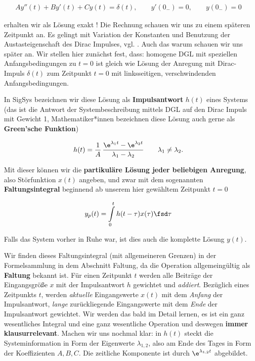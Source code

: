 \begin{mdframed}[backgroundcolor=C3!10]
\begin{align}
A y''(t) + B y'(t) + C y(t) = \delta(t),\qquad y'(0_-) = 0,\qquad y(0_-) = 0
\end{align}
\end{mdframed}
erhalten wir als Lösung exakt !
%
Die Rechnung schauen wir uns zu einem späteren Zeitpunkt an. Es gelingt mit Variation
der Konstanten und Benutzung der Austasteigenschaft des Dirac Impulses,
vgl. \cite[S.133ff]{Strang2014}.
%
Auch das warum schauen wir uns später an. Wir stellen hier zunächst fest, dass:
homogene DGL mit speziellen Anfangsbedingungen zu $t=0$ ist gleich wie
Lösung der Anregung mit Dirac-Impuls $\delta(t)$ zum Zeitpunkt $t=0$ mit
linksseitigen, verschwindenden Anfangsbedingungen.

In SigSys bezeichnen wir diese Lösung als \textbf{Impulsantwort} $h(t)$
eines Systems (das ist die Antwort der Systembeschreibung mittels DGL auf den
Dirac Impuls mit Gewicht 1, Mathematiker*innen
bezeichnen diese Lösung auch gerne als \textbf{Green'sche Funktion})
\begin{mdframed}[backgroundcolor=C3!10]
\begin{align}
h(t) =
\frac{1}{A}\,\frac{\e^{\lambda_1 t} - \e^{\lambda_2 t}}{\lambda_1 - \lambda_2}
\qquad \lambda_1 \neq \lambda_2.
\end{align}
\end{mdframed}

Mit dieser können wir die \textbf{partikuläre Lösung jeder beliebigen Anregung},
also Störfunktion $x(t)$ angeben, und zwar mit dem sogenannten
\textbf{Faltungsintegral} beginnend ab unserem hier gewähltem
Zeitpunkt $t=0$
%
\begin{mdframed}[backgroundcolor=C3!10]
\begin{equation}
y_p(t) = \int\limits_{0}^{t} h(t-\tau) x(\tau) \fsd \tau
\end{equation}
\end{mdframed}
%
Falls das System vorher in Ruhe war, ist dies auch die komplette Lösung $y(t)$.
%

Wir finden dieses Faltungsintegral (mit allgemeineren Grenzen) in der
Formelsammlung in dem Abschnitt Faltung, da die Operation allgemeingültig als
\textbf{Faltung} bekannt ist.
%
Für einen Zeitpunkt $t$ werden alle Beiträge der Eingangsgröße $x$ mit der Impulsantwort $h$
gewichtet und \textit{addiert}. Bezüglich eines Zeitpunkts $t$, werden \textit{aktuelle}
Eingangswerte $x(t)$ mit dem \textit{Anfang} der Impulsantwort, \textit{lange}
zurückliegende Eingangswerte mit dem \textit{Ende} der Impulsantwort gewichtet.
%
Wir werden das bald im Detail lernen, es ist ein ganz wesentliches Integral und
eine ganz wesentliche Operation und deswegen \textbf{immer klausurrelevant}.
%
Machen wir uns nochmal klar: in $h(t)$ steckt die Systeminformation in Form
der Eigenwerte $\lambda_{1,2}$, also am Ende des Tages in Form der Koeffizienten $A,B,C$.
Die zeitliche Komponente ist durch $\e^{\lambda_{1,2} t}$ abgebildet.

